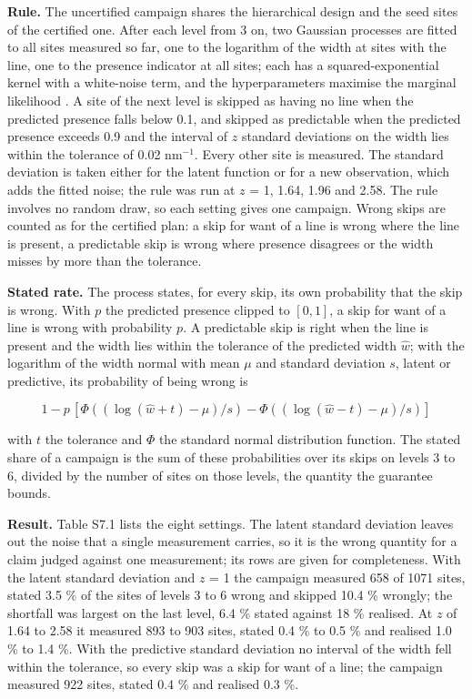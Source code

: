 \documentclass{iopjournal}
\begin{document}
\textbf{Rule.} The uncertified campaign shares the hierarchical design and the seed sites of the certified one. After each level from 3 on, two Gaussian processes are fitted to all sites measured so far, one to the logarithm of the width at sites with the line, one to the presence indicator at all sites; each has a squared-exponential kernel with a white-noise term, and the hyperparameters maximise the marginal likelihood \cite{RasmussenWilliams2006}. A site of the next level is skipped as having no line when the predicted presence falls below 0.1, and skipped as predictable when the predicted presence exceeds 0.9 and the interval of \(z\) standard deviations on the width lies within the tolerance of 0.02 nm\ensuremath{^{-1}}. Every other site is measured. The standard deviation is taken either for the latent function or for a new observation, which adds the fitted noise; the rule was run at \(z\) = 1, 1.64, 1.96 and 2.58. The rule involves no random draw, so each setting gives one campaign. Wrong skips are counted as for the certified plan: a skip for want of a line is wrong where the line is present, a predictable skip is wrong where presence disagrees or the width misses by more than the tolerance.

\textbf{Stated rate.} The process states, for every skip, its own probability that the skip is wrong. With \(p\) the predicted presence clipped to \([0, 1]\), a skip for want of a line is wrong with probability \(p\). A predictable skip is right when the line is present and the width lies within the tolerance of the predicted width \(\hat w\); with the logarithm of the width normal with mean \(\mu\) and standard deviation \(s\), latent or predictive, its probability of being wrong is

\[
1 - p \, [\Phi((\log(\hat w + t) - \mu)/s) - \Phi((\log(\hat w - t) - \mu)/s)]
\]

with \(t\) the tolerance and \(\Phi\) the standard normal distribution function. The stated share of a campaign is the sum of these probabilities over its skips on levels 3 to 6, divided by the number of sites on those levels, the quantity the guarantee bounds.

\textbf{Result.} Table S7.1 lists the eight settings. The latent standard deviation leaves out the noise that a single measurement carries, so it is the wrong quantity for a claim judged against one measurement; its rows are given for completeness. With the latent standard deviation and \(z\) = 1 the campaign measured 658 of 1071 sites, stated 3.5 \% of the sites of levels 3 to 6 wrong and skipped 10.4 \% wrongly; the shortfall was largest on the last level, 6.4 \% stated against 18 \% realised. At \(z\) of 1.64 to 2.58 it measured 893 to 903 sites, stated 0.4 \% to 0.5 \% and realised 1.0 \% to 1.4 \%. With the predictive standard deviation no interval of the width fell within the tolerance, so every skip was a skip for want of a line; the campaign measured 922 sites, stated 0.4 \% and realised 0.3 \%.
\end{document}
